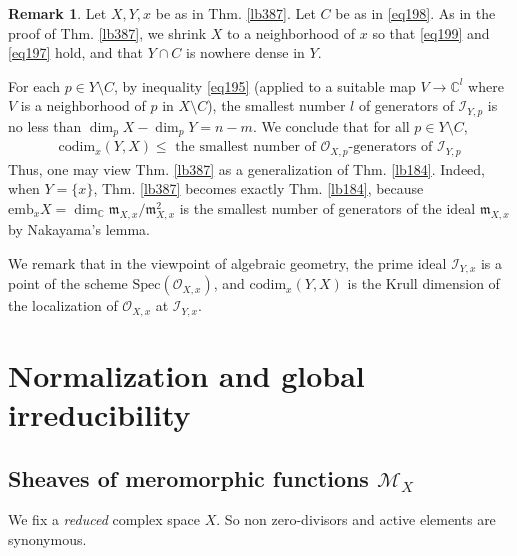 \documentclass[12pt,b5paper,notitlepage]{report}
\theoremstyle{definition}
\newtheorem{rem}[df]{Remark}
\theoremstyle{plain}
\newcommand{\scr}{\mathscr}
\newcommand{\Cbb}{\mathbb C}
\newcommand{\emb}{\mathrm{emb}}
\newcommand{\mk}{\mathfrak m}
\newcommand{\codim}{\mathrm{codim}}
\numberwithin{equation}{section}
\begin{document}
\begin{rem}
Let $X,Y,x$ be as in Thm. \ref{lb387}. Let $C$ be as in \eqref{eq198}. As in the proof of Thm. \ref{lb387}, we shrink $X$ to a neighborhood of $x$ so that \eqref{eq199} and \eqref{eq197} hold, and that $Y\cap C$ is nowhere dense in $Y$.

For each $p\in Y\setminus C$, by inequality \eqref{eq195} (applied to a suitable map $V\rightarrow \Cbb^l$ where $V$ is a neighborhood of $p$ in $X\setminus C$), the smallest number $l$ of generators of $\scr I_{Y,p}$ is no less than  $\dim_p X-\dim_p Y=n-m$. We conclude that for all $p\in Y\setminus C$,
\begin{align}
\codim_x(Y,X)\leq\text{ the smallest number of $\scr O_{X,p}$-generators of }\scr I_{Y,p}
\end{align}
Thus, one may view Thm. \ref{lb387} as a generalization of Thm. \ref{lb184}. Indeed, when $Y=\{x\}$, Thm. \ref{lb387} becomes exactly Thm. \ref{lb184}, because $\emb_xX=\dim_\Cbb\mk_{X,x}/\mk_{X,x}^2$ is the smallest number of generators of the ideal $\mk_{X,x}$ by Nakayama's lemma. 

We remark that in the viewpoint of algebraic geometry, the prime ideal $\scr I_{Y,x}$ is a point of the scheme $\mathrm{Spec}(\scr O_{X,x})$, and $\codim_x(Y,X)$ is the Krull dimension of the localization of $\scr O_{X,x}$ at $\scr I_{Y,x}$.   \hfill\qedsymbol
\end{rem}















\chapter{Normalization and global irreducibility}



\section{Sheaves of meromorphic functions $\scr M_X$}



We fix a \emph{reduced} complex space $X$. So non zero-divisors and active elements are synonymous.
\end{document}
